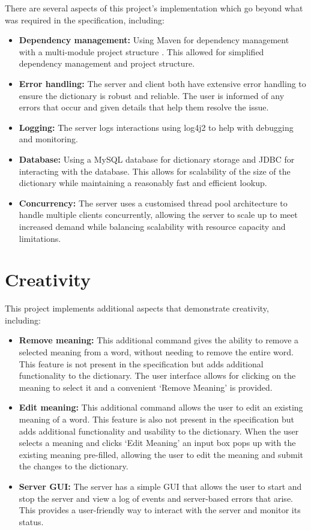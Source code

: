 \documentclass{article}
\begin{document}
There are several aspects of this project's implementation which go beyond what was required in the specification, including:
\begin{itemize}
    \item \textbf{Dependency management:} Using Maven for dependency management with a multi-module project structure \cite{apache-maven-pom}. This allowed for simplified dependency management and project structure.
    \item \textbf{Error handling:} The server and client both have extensive error handling to ensure the dictionary is robust and reliable. The user is informed of any errors that occur and given details that help them resolve the issue.
    \item \textbf{Logging:} The server logs interactions using log4j2 to help with debugging and monitoring.
    \item \textbf{Database:} Using a MySQL database for dictionary storage and JDBC for interacting with the database. This allows for scalability of the size of the dictionary while maintaining a reasonably fast and efficient lookup.
    \item \textbf{Concurrency:} The server uses a customised thread pool architecture to handle multiple clients concurrently, allowing the server to scale up to meet increased demand while balancing scalability with resource capacity and limitations.
\end{itemize}

\section*{Creativity}

This project implements additional aspects that demonstrate creativity, including:
\begin{itemize}
    \item \textbf{Remove meaning:} This additional command gives the ability to remove a selected meaning from a word, without needing to remove the entire word. This feature is not present in the specification but adds additional functionality to the dictionary. The user interface allows for clicking on the meaning to select it and a convenient `Remove Meaning' is provided.
    \item \textbf{Edit meaning:} This additional command allows the user to edit an existing meaning of a word. This feature is also not present in the specification but adds additional functionality and usability to the dictionary. When the user selects a meaning and clicks `Edit Meaning' an input box pops up with the existing meaning pre-filled, allowing the user to edit the meaning and submit the changes to the dictionary.
    \item \textbf{Server GUI:} The server has a simple GUI that allows the user to start and stop the server and view a log of events and server-based errors that arise. This provides a user-friendly way to interact with the server and monitor its status.
\end{itemize}


\printbibliography
\end{document}
